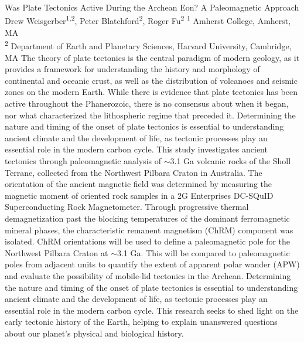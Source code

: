 \makeabstract
    {
    Was Plate Tectonics Active During the Archean Eon? A Paleomagnetic Approach
    }
    {
    Drew Weisgerber\textsuperscript{1,2}, Peter Blatchford\textsuperscript{2}, Roger Fu\textsuperscript{2}
    }
    {
    \textsuperscript{1} Amherst College, Amherst, MA\\
\textsuperscript{2} Department of Earth and Planetary Sciences, Harvard University, Cambridge, MA
    }
    {
    The theory of plate tectonics is the central paradigm of modern geology, as it provides a framework for understanding the history and morphology of continental and oceanic crust, as well as the distribution of volcanoes and seismic zones on the modern Earth. While there is evidence that plate tectonics has been active throughout the Phanerozoic, there is no consensus about when it began, nor what characterized the lithospheric regime that preceded it. Determining the nature and timing of the onset of plate tectonics is essential to understanding ancient climate and the development of life, as tectonic processes play an essential role in the modern carbon cycle.
    }
    {
    This study investigates ancient tectonics through paleomagnetic analysis of $\sim$3.1 Ga volcanic rocks of the Sholl Terrane, collected from the Northwest Pilbara Craton in Australia. The orientation of the ancient magnetic field was determined by measuring the magnetic moment of oriented rock samples in a 2G Enterprises DC-SQuID Superconducting Rock Magnetometer. Through progressive thermal demagnetization past the blocking temperatures of the dominant ferromagnetic mineral phases, the characteristic remanent magnetism (ChRM) component was isolated.
    }
    {
    ChRM orientations will be used to define a paleomagnetic pole for the Northwest Pilbara Craton at $\sim$3.1 Ga. This will be compared to paleomagnetic poles from adjacent units to quantify the extent of apparent polar wander (APW) and evaluate the possibility of mobile-lid tectonics in the Archean.
    }
    {
    Determining the nature and timing of the onset of plate tectonics is essential to understanding ancient climate and the development of life, as tectonic processes play an essential role in the modern carbon cycle. This research seeks to shed light on the early tectonic history of the Earth, helping to explain unanswered questions about our planet's physical and biological history.
    }

    \newpage
    
